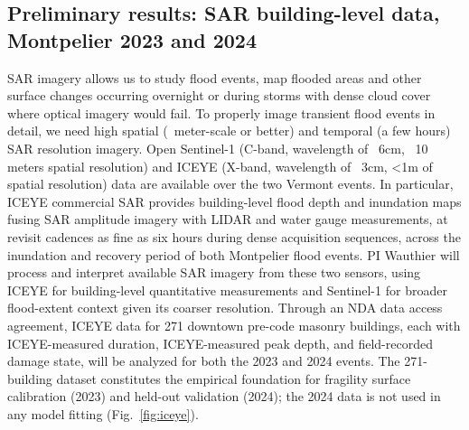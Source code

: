 \documentclass[11pt]{article}
\begin{document}
\vspace{-10pt}
\subsection{Preliminary results: SAR building-level data, Montpelier 2023 and 2024}

SAR imagery allows us to study flood events, map flooded areas and other surface changes occurring overnight or during storms with dense cloud cover where optical imagery would fail. To properly image transient flood events in detail, we need high spatial (~meter-scale or better) and temporal (a few hours) SAR resolution imagery. Open Sentinel-1 (C-band, wavelength of ~6cm, ~10 meters spatial resolution) and ICEYE (X-band, wavelength of ~3cm, <1m of spatial resolution) data are available over the two Vermont events.
In particular, ICEYE commercial SAR provides building-level flood depth and inundation maps fusing SAR amplitude imagery with LIDAR and water gauge measurements, at revisit cadences as fine as six hours during dense acquisition sequences, across the inundation and recovery period of both Montpelier flood events.
PI Wauthier will process and interpret available SAR imagery from these two sensors, using ICEYE for building-level quantitative measurements and Sentinel-1 for broader flood-extent context given its coarser resolution.  Through an NDA data access agreement, ICEYE data for 271 downtown pre-code masonry buildings, each with ICEYE-measured duration, ICEYE-measured peak depth, and field-recorded damage state, will be analyzed for both the 2023 and 2024 events.
The 271-building dataset constitutes the empirical foundation for fragility surface calibration (2023) and held-out validation (2024); the 2024 data is not used in any model fitting (Fig.~\ref{fig:iceye}).
\end{document}
